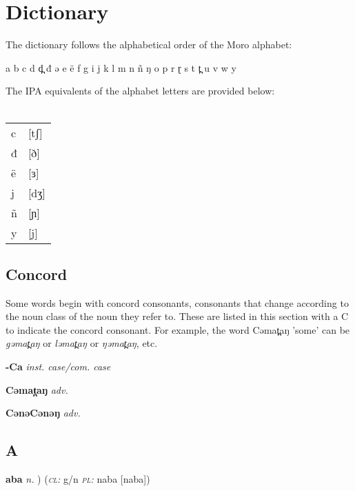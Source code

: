 \chapter{Dictionary}\label{dictionary}

The dictionary follows the alphabetical order of the Moro alphabet: \vspace{5mm}

a b c d d̪ đ ə e ë f g i j k l m n ñ ŋ o p r ɽ s t t̪ u v w y 
\vspace{5mm}


The IPA equivalents of the alphabet letters are provided below:\\
\\

\begin{tabular}[t]{ll}
c	&[tʃ]\\
đ	&[ð]\\
ë	&[ɜ]\\
j	&[dʒ]\\
ñ	&[ɲ]\\
y	&[j]\\
\end{tabular}
\z


\section*{Concord}\label{Concord}

Some words begin with concord consonants, consonants that change according to the noun class of the noun they refer to. These are listed in this section with a C to indicate the concord consonant. For example, the word Cəmat̪aŋ 'some' can be \textit{gəmat̪aŋ} or \textit{ləmat̪aŋ} or \textit{ŋəmat̪aŋ}, etc. \vspace{5mm}

\newentry
\headword\textbf{-Ca}  
\ipa{[-Ca]}
\synpos\textit{inst. case/com. case} 

\newentry
\headword\textbf{Cəmat̪aŋ}  
\ipa{[Cəmat̪aŋ]}
\synpos\textit{adv.} 

\newentry
\headword\textbf{CənəCənəŋ}  
\ipa{[CənəCənəŋ]}
\synpos\textit{adv.} 

\section*{A}\label{A} 

\newentry
\headword\textbf{aba}
\ipa{[aba]}
\synpos\textit{n.} 
) 
\class(\textit{\textsc{cl:}} {g/n}
\plural\textit{\textsc{pl:}} naba [naba])

